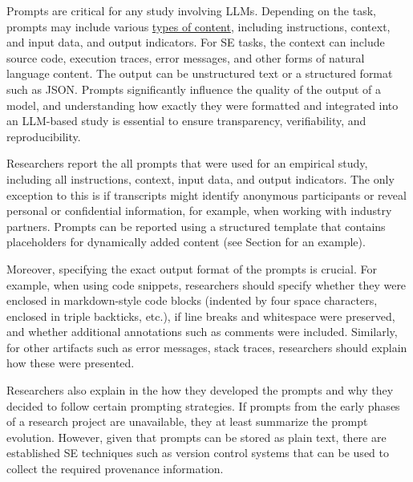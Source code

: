 Prompts are critical for any study involving LLMs.
Depending on the task, prompts may include various \href{https://www.promptingguide.ai/introduction/elements}{types of content}, including instructions, context, and input data, and output indicators.
For SE tasks, the context can include source code, execution traces, error messages, and other forms of natural language content.
The output can be unstructured text or a structured format such as JSON.
Prompts significantly influence the quality of the output of a model, and understanding how exactly they were formatted and integrated into an LLM-based study is essential to ensure transparency, verifiability, and reproducibility.


Researchers \must report the all prompts that were used for an empirical study, including all instructions, context, input data, and output indicators.
The only exception to this is if transcripts might identify anonymous participants or reveal personal or confidential information, for example, when working with industry partners.
Prompts can be reported using a structured template that contains placeholders for dynamically added content (see Section \judges for an example).

Moreover, specifying the exact output format of the prompts is crucial.
For example, when using code snippets, researchers should specify whether they were enclosed in markdown-style code blocks (indented by four space characters, enclosed in triple backticks, etc.), if line breaks and whitespace were preserved, and whether additional annotations such as comments were included.
Similarly, for other artifacts such as error messages, stack traces, researchers should explain how these were presented.

Researchers \must also explain in the \paper how they developed the prompts and why they decided to follow certain prompting strategies.
If prompts from the early phases of a research project are unavailable, they \must at least summarize the prompt evolution.
However, given that prompts can be stored as plain text, there are established SE techniques such as version control systems that can be used to collect the required provenance information.

